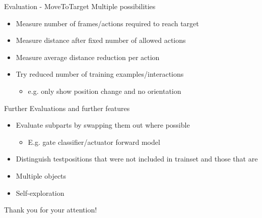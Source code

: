 \documentclass{beamer}
\begin{document}
\begin{frame}{Evaluation - MoveToTarget}
Multiple possibilities
\begin{itemize}
\item Measure number of frames/actions required to reach target
\item Measure distance after fixed number of allowed actions
\item Measure average distance reduction per action
\item Try reduced number of training examples/interactions
\begin{itemize}
	\item e.g. only show position change and no orientation
\end{itemize}
\end{itemize}
\end{frame}

\begin{frame}{Further Evaluations and further features}

\begin{itemize}
\item Evaluate subparts by swapping them out where possible
	\begin{itemize}
	\item E.g. gate classifier/actuator forward model
	\end{itemize}
\item Distinguish testpositions that were not included in trainset and those that are
\item Multiple objects
\item Self-exploration
\end{itemize}
\end{frame}


\begin{frame}
\begin{center}
{\Large Thank you for your attention!}
\end{center}
\end{frame}
\end{document}
